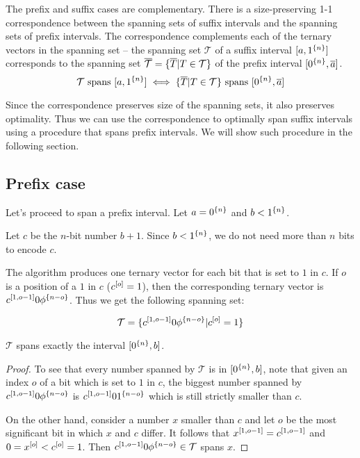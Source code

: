 
The prefix and suffix cases are complementary.
There is a size-preserving
1-1
correspondence between
the spanning sets of suffix intervals
and the spanning sets
of prefix intervals.
The correspondence complements each of the ternary vectors in the spanning set
-- the spanning set $\mathcal{T}$
of a suffix interval $[a, 1^{\{n\}}]$
corresponds to the spanning set
$\overline{\mathcal{T}}
= \{\overline{T} | T \in \mathcal{T}\}$
of the prefix interval
$[0^{\{n\}}, \overline{a}]$.
$$
\mathcal{T} \text{ spans } [a, 1^{\{n\}}]
\iff
\{\overline{T} | T \in \mathcal{T}\}
\text{ spans } [0^{\{n\}}, \overline{a}]
$$

Since the correspondence preserves
size of the spanning sets,
it also preserves optimality.
Thus we can use the correspondence to optimally span
suffix intervals
using a procedure that spans prefix intervals.
We will show such procedure in the following section.

\subsection{Prefix case}
\label{sec:prefix}

Let's proceed to span a prefix interval.
Let $a = 0^{\{n\}}$ and $b < 1^{\{n\}}$.

Let $c$ be the $n$-bit number $b + 1$.
Since $b < 1^{\{n\}}$,
we do not need more than $n$ bits to encode $c$.

The algorithm produces one ternary vector
for each bit that is set to $1$ in $c$.
If $o$ is a position of a $1$ in $c$
($c^{[o]} = 1$),
then the corresponding ternary vector
is $c^{[1, o - 1]} 0 \phi^{\{n - o\}}$.
Thus we get the following spanning set:

\begin{equation*}
\mathcal{T} =
\{c^{[1, o - 1]} 0 \phi^{\{n - o\}} | c^{[o]} = 1\}
\end{equation*}

\begin{theorem}[Feasibility]
\label{theorem:prefixfeasible}
$\mathcal{T}$ spans exactly the interval
$[0^{\{n\}}, b]$.
\end{theorem}

\begin{proof}
To see that every number spanned by $\mathcal{T}$
is in $[0^{\{n\}}, b]$,
note that given an index $o$ of a bit which is set to $1$
in $c$,
the biggest number spanned by
$c^{[1, o-1]} 0 \phi^{\{n-o\}}$ is
$c^{[1, o-1]} 0 1^{\{n-o\}}$
which is still strictly smaller than $c$.

On the other hand,
consider a number $x$ smaller than $c$
and let $o$ be the most significant bit in which $x$ and $c$ differ. It follows that
$x^{[1, o-1]} = c^{[1, o-1]}$
and $0 = x^{[o]} < c^{[o]} = 1$.
Then
$c^{[1, o - 1]} 0 \phi^{\{n - o\}} \in \mathcal{T}$
spans $x$.
\end{proof}

